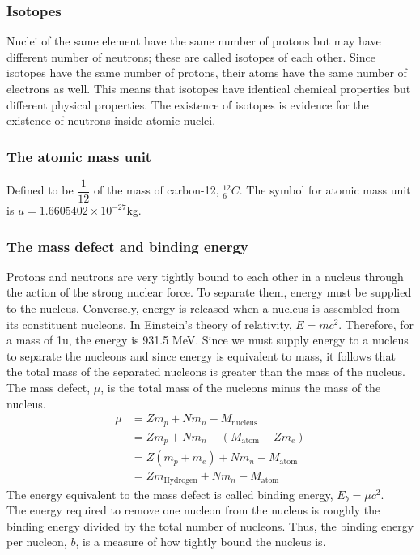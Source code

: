 \documentclass[a4paper,12pt]{article}
\begin{document}
\subsubsection*{Isotopes}
Nuclei of the same element have the same number of protons but may have different number of neutrons; these are called isotopes of each other. Since isotopes have the same number of protons, their atoms have the same number of electrons as well. This means that isotopes have identical chemical properties but different physical properties. The existence of isotopes is evidence for the existence of neutrons inside atomic nuclei.
\subsubsection*{The atomic mass unit}
Defined to be $\dfrac{1}{12}$ of the mass of carbon-12, $^{12}_6C$. The symbol for atomic mass unit is $u=1.6605402 \times 10^{−27}$kg.
\subsubsection*{The mass defect and binding energy}
Protons and neutrons are very tightly bound to each other in a nucleus through the action of the strong nuclear force. To separate them, energy must be supplied to the nucleus. Conversely, energy is released when a nucleus is assembled from its constituent nucleons.
In Einstein's theory of relativity, $E=mc^2$. Therefore, for a mass of 1u, the energy is 931.5 MeV. Since we must supply energy to a nucleus to separate the nucleons and since energy is equivalent to mass, it follows that the total mass of the separated nucleons is greater than the mass of the nucleus. The mass defect, $\mu$, is the total mass of the nucleons minus the mass of the nucleus.
\[
\begin{aligned}
\mu&=Zm_p+Nm_n-M_\text{nucleus}\\
&=Zm_p+Nm_n-(M_\text{atom}-Zm_e)\\
&=Z(m_p+m_e)+Nm_n-M_\text{atom}\\
&=Zm_\text{Hydrogen}+Nm_n-M_\text{atom}
\end{aligned}\]
The energy equivalent to the mass defect is called binding energy, $E_b=\mu c^2$.\\
The energy required to remove one nucleon from the nucleus is roughly the binding energy divided by the total number of nucleons. Thus, the binding energy per nucleon, $b$, is a measure of how tightly bound the nucleus is.
\end{document}
